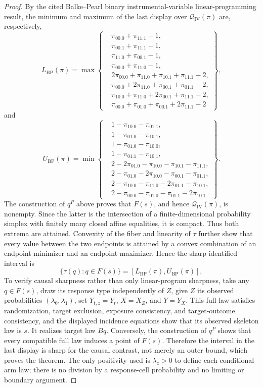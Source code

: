 \documentclass{article}
\begin{document}
\begin{proof}
By the cited Balke--Pearl binary instrumental-variable linear-programming result, the minimum and maximum of the last display over \(\mathcal Q_{\mathrm{IV}}(\pi)\) are, respectively,
\[
L_{\mathrm{BP}}(\pi)=\max\left\{
\begin{aligned}
&\pi_{00.0}+\pi_{11.1}-1,\\
&\pi_{00.1}+\pi_{11.1}-1,\\
&\pi_{11.0}+\pi_{00.1}-1,\\
&\pi_{00.0}+\pi_{11.0}-1,\\
&2\pi_{00.0}+\pi_{11.0}+\pi_{10.1}+\pi_{11.1}-2,\\
&\pi_{00.0}+2\pi_{11.0}+\pi_{00.1}+\pi_{01.1}-2,\\
&\pi_{10.0}+\pi_{11.0}+2\pi_{00.1}+\pi_{11.1}-2,\\
&\pi_{00.0}+\pi_{01.0}+\pi_{00.1}+2\pi_{11.1}-2
\end{aligned}\right\},
\]
and
\[
U_{\mathrm{BP}}(\pi)=\min\left\{
\begin{aligned}
&1-\pi_{10.0}-\pi_{01.1},\\
&1-\pi_{01.0}-\pi_{10.1},\\
&1-\pi_{01.0}-\pi_{10.0},\\
&1-\pi_{01.1}-\pi_{10.1},\\
&2-2\pi_{01.0}-\pi_{10.0}-\pi_{10.1}-\pi_{11.1},\\
&2-\pi_{01.0}-2\pi_{10.0}-\pi_{00.1}-\pi_{01.1},\\
&2-\pi_{10.0}-\pi_{11.0}-2\pi_{01.1}-\pi_{10.1},\\
&2-\pi_{00.0}-\pi_{01.0}-\pi_{01.1}-2\pi_{10.1}
\end{aligned}\right\}.
\]
The construction of \(q^P\) above proves that \(F(s)\), and hence \(\mathcal Q_{\mathrm{IV}}(\pi)\), is nonempty. Since the latter is the intersection of a finite-dimensional probability simplex with finitely many closed affine equalities, it is compact. Thus both extrema are attained. Convexity of the fiber and linearity of \(\tau\) further show that every value between the two endpoints is attained by a convex combination of an endpoint minimizer and an endpoint maximizer. Hence the sharp identified interval is
\[
\{\tau(q):q\in F(s)\}
=[L_{\mathrm{BP}}(\pi),U_{\mathrm{BP}}(\pi)],
\]
To verify causal sharpness rather than only linear-program sharpness, take any \(q\in F(s)\), draw its response type independently of \(Z\), give \(Z\) its observed probabilities \((\lambda_0,\lambda_1)\), set \(Y_{t,z}=Y_t\), \(X=X_Z\), and \(Y=Y_X\). This full law satisfies randomization, target exclusion, exposure consistency, and target-outcome consistency, and the displayed incidence equations show that its observed skeleton law is \(s\). It realizes target law \(Bq\). Conversely, the construction of \(q^P\) shows that every compatible full law induces a point of \(F(s)\). Therefore the interval in the last display is sharp for the causal contrast, not merely an outer bound, which proves the theorem. The only positivity used is \(\lambda_z>0\) to define each conditional arm law; there is no division by a response-cell probability and no limiting or boundary argument.
\end{proof}
\end{document}

